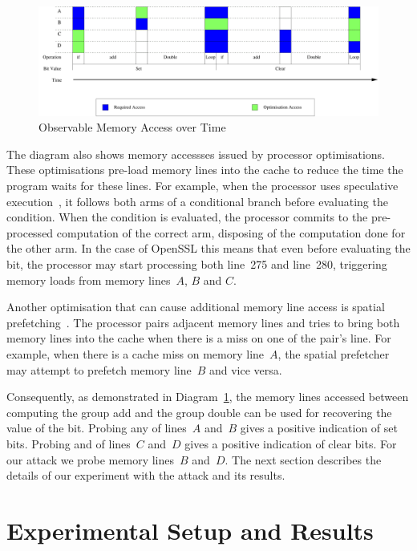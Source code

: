 \documentclass{llncs}
\begin{document}
\begin{figure}[htb]
\centering\includegraphics[width=\columnwidth]{images/temporal}
\caption{Observable Memory Access over Time\label{dgm:temporal}}
\end{figure}

The diagram also shows memory accessses issued by processor optimisations.
These optimisations pre-load memory lines into the cache to reduce the time the program waits for these lines.
For example, when the processor uses speculative execution~\cite{uht95disjoint}, it follows both arms of a conditional
branch before evaluating the condition.
When the condition is evaluated, the processor commits to the pre-processed computation of the correct arm,
disposing of the computation done for the other arm. 
In the case of OpenSSL this means that even before evaluating the bit, 
the processor may start processing both line~275 and line~280, triggering memory loads from memory lines~$A$, $B$ and $C$.

Another optimisation that can cause additional memory line access is spatial prefetching~\cite{intel12optimization}.
The processor pairs adjacent memory lines and tries to bring both memory lines into the cache
when there is a miss on one of the pair's line.
For example, when there is a cache miss on memory line~$A$, the spatial prefetcher may attempt to prefetch memory line~$B$
and vice versa.

Consequently, as demonstrated in Diagram~\ref{dgm:temporal}, the memory lines accessed between computing
the group add and the group double can be used for recovering the value of the bit.
Probing any of lines~$A$ and~$B$ gives a positive indication of set bits.  
Probing and of lines~$C$ and~$D$ gives a positive indication of clear bits.
For our attack we probe memory lines~$B$ and~$D$.
The next section describes the details of our experiment with the attack and its results.


\section{Experimental Setup and Results}\label{sec:results}
\end{document}
